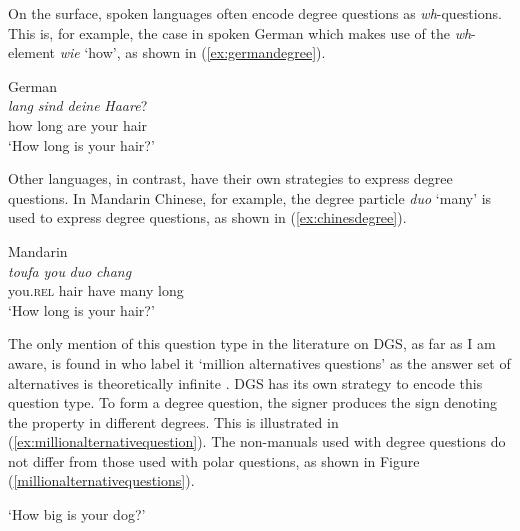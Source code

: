 On the surface, spoken languages often encode degree questions as \textit{wh}-ques\-tions. This is, for example, the case in spoken German which makes use of the \textit{wh}-element \textit{wie} `how', as shown in (\ref{ex:germandegree}).

\begin{exe}
\ex German \\  {\textit{lang}} {\textit{sind}} {\textit{deine}} {\textit{Haare}?} \\
{how} {long} {are} {your} {hair} \\
\trans `How long is your hair?' \label{ex:germandegree}
\end{exe}


\noindent Other languages, in contrast, have their own strategies to express degree questions. In Mandarin Chinese, for example, the degree particle \textit{duo} `many' is used to express degree questions, as shown in (\ref{ex:chinesdegree}).


\begin{exe}
\ex Mandarin \\  {\textit{toufa}} {\textit{you}} {\textit{duo}} {\textit{chang}} \\
{you.\textsc{rel}} {hair} {have} {many} {long} \\
\trans `How long is your hair?' \label{ex:chinesdegree}
\end{exe}

\noindent The only mention of this question type in the literature on DGS, as far as I am aware, is found in \citet[335]{happ2014vork} who label it `million alternatives questions' as the answer set of alternatives is theoretically infinite \citep{fox2006universal}. DGS has its own strategy to encode this question type. To form a degree question, the signer produces the sign denoting the property in different degrees. This is illustrated in (\ref{ex:millionalternativequestion}). The non-manuals used with degree questions do not differ from those used with polar questions, as shown in Figure (\ref{millionalternativequestions}).

\begin{exe}
\ex {}
\glt `How big is your dog?' \label{ex:millionalternativequestion}
\end{exe}


